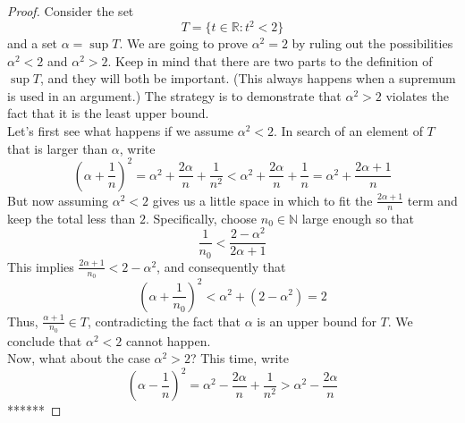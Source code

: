 \documentclass[10pt]{report}
\begin{document}
\begin{proof}
Consider the set
$$T = \{t\in\mathbb{R}:t^2<2\}$$
and a set $\alpha = \sup T$. We are going to prove $\alpha^2 = 2$ by ruling out the possibilities $\alpha^2<2$ and $\alpha^2>2$. Keep in mind that there are two parts to the definition of $\sup T$, and they will both be important. (This always happens when a supremum is used in an argument.) The strategy is to demonstrate that $\alpha^2>2$ violates the fact that it is the least upper bound.\\
Let's first see what happens if we assume $\alpha^2<2$. In search of an element of $T$ that is larger than $\alpha$, write
$$\left( \alpha + \frac{1}{n}\right)^2 = \alpha^2 + \frac{2\alpha}{n} + \frac{1}{n^2} < \alpha^2 + \frac{2\alpha}{n} + \frac{1}{n} = \alpha^2 +\frac{2\alpha +1}{n}$$
But now assuming $\alpha^2<2$ gives us a little space in which to fit the $\frac{2\alpha + 1}{n}$ term and keep the total less than $2$. Specifically, choose $n_0\in\mathbb{N}$ large enough so that
$$\frac{1}{n_0}<\frac{2-\alpha^2}{2\alpha + 1}$$
This implies $\frac{2\alpha + 1}{n_0}<2-\alpha^2$, and consequently that
$$\left(\alpha +\frac{1}{n_0}\right)^2 < \alpha^2 + (2-\alpha^2) =2$$
Thus, $\frac{\alpha + 1}{n_0}\in T$, contradicting the fact that $\alpha$ is an upper bound for $T$. We conclude that $\alpha^2<2$ cannot happen.\\
Now, what about the case $\alpha^2>2$? This time, write
$$\left(\alpha-\frac{1}{n}\right)^2 = \alpha^2 - \frac{2\alpha}{n} + \frac{1}{n^2} > \alpha^2 - \frac{2\alpha}{n}$$
******
\end{proof}
\end{document}
